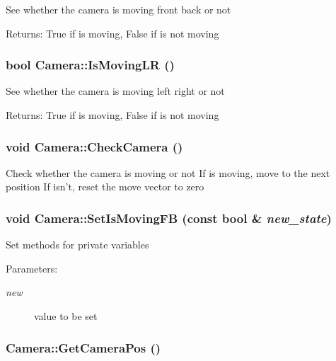 See whether the camera is moving front back or not \begin{Desc}
\item[Returns:]True if is moving, False if is not moving \end{Desc}
\hypertarget{class_camera_fcc769dba8370d89bc0dbd490dcebc17}{
\subsubsection[IsMovingLR]{\setlength{\rightskip}{0pt plus 5cm}bool Camera::IsMovingLR ()}}
\label{class_camera_fcc769dba8370d89bc0dbd490dcebc17}


See whether the camera is moving left right or not \begin{Desc}
\item[Returns:]True if is moving, False if is not moving \end{Desc}
\hypertarget{class_camera_5757577b0e11b8722bf251ee086eef1d}{
\subsubsection[CheckCamera]{\setlength{\rightskip}{0pt plus 5cm}void Camera::CheckCamera ()}}
\label{class_camera_5757577b0e11b8722bf251ee086eef1d}


Check whether the camera is moving or not If is moving, move to the next position If isn't, reset the move vector to zero \hypertarget{class_camera_3783824757ec844c64f273de2ec7c276}{
\subsubsection[SetIsMovingFB]{\setlength{\rightskip}{0pt plus 5cm}void Camera::SetIsMovingFB (const bool \& {\em new\_\-state})}}
\label{class_camera_3783824757ec844c64f273de2ec7c276}


Set methods for private variables \begin{Desc}
\item[Parameters:]
\begin{description}
\item[{\em new}]value to be set \end{description}
\end{Desc}
\hypertarget{class_camera_7a2d4de877c54c012a81ecdf09872f61}{
\subsubsection[GetCameraPos]{ Camera::GetCameraPos ()}}
\label{class_camera_7a2d4de877c54c012a81ecdf09872f61}


